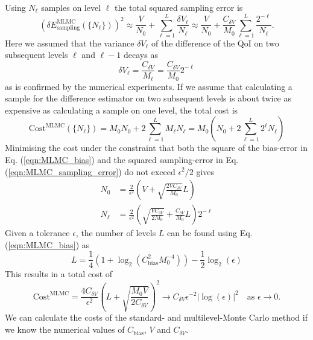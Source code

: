 \documentclass[11pt]{article}
\begin{document}
Using $N_\ell$ samples on level $\ell$ the total squared sampling error is
\begin{equation}
  \left(\delta E^{\text{MLMC}}_{\text{sampling}}(\{N_\ell\})\right)^2 \approx \frac{V}{N_0} + \sum_{\ell=1}^{L} \frac{\delta V_\ell}{N_\ell}
  \approx \frac{V}{N_0} + \frac{C_{\delta V}}{M_0} \sum_{\ell=1}^{L} \frac{2^{-\ell}}{N_\ell}.
  \label{eqn:MLMC_sampling_error}
\end{equation}
Here we assumed that the variance $\delta V_\ell$ of the difference of the QoI on two subsequent levels $\ell$ and $\ell-1$ decays as
\begin{equation}
  \delta V_\ell = \frac{C_{\delta V}}{M_{\ell}} = \frac{C_{\delta V}}{M_0} 2^{-\ell}
\end{equation}
as is confirmed by the numerical experiments.
If we assume that calculating a sample for the difference estimator on two subsequent levels is about twice as expensive as calculating a sample on one level, the total cost is
\begin{equation}
  \text{Cost}^{\text{MLMC}}(\{N_\ell\}) = M_0N_0 + 2\sum_{\ell=1}^{L} M_\ell N_\ell =
  M_0 \left(N_0 + 2\sum_{\ell=1}^{L} 2^\ell N_\ell\right)
\end{equation}
Minimising the cost under the constraint that both the square of the bias-error in Eq. (\ref{eqn:MLMC_bias}) and the squared sampling-error in Eq. (\ref{eqn:MLMC_sampling_error}) do not exceed $\epsilon^2/2$ gives
\begin{equation}
  \begin{aligned}
    N_0 &= \frac{2}{\epsilon^2}\left(V+\sqrt{\frac{2VC_{\delta V}}{M_0}}L\right)\\
    N_{\ell} &= \frac{2}{\epsilon^2}\left(\sqrt{\frac{V C_{\delta V}}{2M_0}}+\frac{C_{\delta V}}{M_0}L\right)2^{-\ell}
  \end{aligned}
\end{equation}
Given a tolerance $\epsilon$, the number of levels $L$ can be found using Eq. (\ref{eqn:MLMC_bias}) as
\begin{equation}
  L = \frac{1}{4} \left(1+\log_2\left(C_{\text{bias}}^2M_0^{-4}\right)\right)-\frac{1}{2}\log_2(\epsilon)
\end{equation}
This results in a total cost of
\begin{equation}
  \text{Cost}^{\text{MLMC}} = \frac{4C_{\delta V}}{\epsilon^2}\left(L+\sqrt{\frac{M_0V}{2C_{\delta V}}}\right)^2 \rightarrow C_{\delta V}\epsilon^{-2}|\log(\epsilon)|^2\quad\text{as $\epsilon\rightarrow 0$}.
\end{equation}
We can calculate the costs of the standard- and multilevel-Monte Carlo method if we know the numerical values of $C_{\text{bias}}$, $V$ and $C_{\delta V}$.
\end{document}
